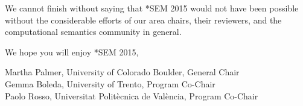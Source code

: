 We cannot finish without saying  that *SEM 2015 would not have been possible without the considerable efforts of our area chairs,
their reviewers, and the computational semantics community in general.

We hope you will enjoy *SEM 2015,

\vspace{4mm}

\noindent Martha Palmer, University of Colorado Boulder, General Chair\\ 
\noindent Gemma Boleda, University of Trento, Program Co-Chair\\
\noindent Paolo Rosso, Universitat Polit{\`e}cnica de Val{\`e}ncia, Program Co-Chair\\
